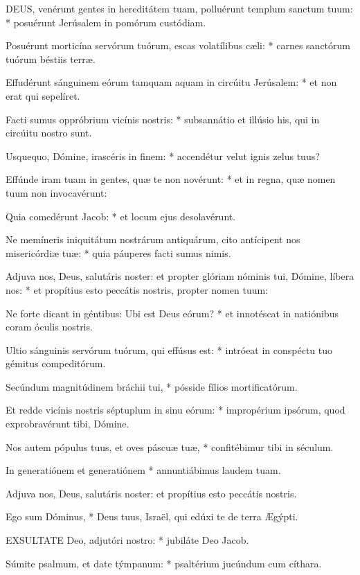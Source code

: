 
\lettrine[lines=2]{D}{EUS}, venérunt gentes in hereditátem tuam, polluérunt templum sanctum tuum: * posuérunt Jerúsalem in pomórum custódiam.

Posuérunt morticína servórum tuórum, escas volatílibus cæli: * carnes sanctórum tuórum béstiis terræ.

Effudérunt sánguinem eórum tamquam aquam in circúitu Jerúsalem: * et non erat qui sepelíret.

Facti sumus oppróbrium vicínis nostris: * subsannátio et illúsio his, qui in circúitu nostro sunt.

Usquequo, Dómine, irascéris in finem: * accendétur velut ignis zelus tuus?

Effúnde iram tuam in gentes, quæ te non novérunt: * et in regna, quæ nomen tuum non invocavérunt:

Quia comedérunt Jacob: * et locum ejus desolavérunt.

Ne memíneris iniquitátum nostrárum antiquárum, cito antícipent nos misericórdiæ tuæ: * quia páuperes facti sumus nimis.

Adjuva nos, Deus, salutáris noster: et propter glóriam nóminis tui, Dómine, líbera nos: * et propítius esto peccátis nostris, propter nomen tuum:

Ne forte dicant in géntibus: Ubi est Deus eórum? * et innotéscat in natiónibus coram óculis nostris.

Ultio sánguinis servórum tuórum, qui effúsus est: * intróeat in conspéctu tuo gémitus compeditórum.

Secúndum magnitúdinem bráchii tui, * pósside fílios mortificatórum.

Et redde vicínis nostris séptuplum in sinu eórum: * impropérium ipsórum, quod exprobravérunt tibi, Dómine.

Nos autem pópulus tuus, et oves páscuæ tuæ, * confitébimur tibi in séculum.

In generatiónem et generatiónem * annuntiábimus laudem tuam.

 Adjuva nos, Deus, salutáris noster: et propítius esto peccátis nostris.

 Ego sum Dóminus, * Deus tuus, Israël, qui edúxi te de terra Ægýpti.


\lettrine[lines=2]{E}{XSULTATE} Deo, adjutóri nostro: * jubiláte Deo Jacob.

Súmite psalmum, et date týmpanum: * psaltérium jucúndum cum cíthara.


